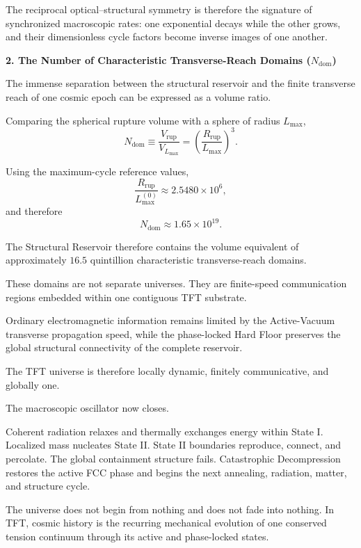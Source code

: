 The reciprocal optical--structural symmetry is therefore the signature of synchronized macroscopic rates: one exponential decays while the other grows, and their dimensionless cycle factors become inverse images of one another.


\vspace{0.5em}
\noindent\textbf{2. The Number of Characteristic Transverse-Reach Domains ($N_{\mathrm{dom}}$)}

The immense separation between the structural reservoir and the finite transverse reach of one cosmic epoch can be expressed as a volume ratio.

Comparing the spherical rupture volume with a sphere of radius $L_{\mathrm{max}}$,
\begin{equation}
    N_{\mathrm{dom}}
    \equiv
    \frac{
        V_{\mathrm{rup}}
    }{
        V_{L_{\mathrm{max}}}
    }
    =
    \left(
        \frac{
            R_{\mathrm{rup}}
        }{
            L_{\mathrm{max}}
        }
    \right)^3.
\end{equation}

Using the maximum-cycle reference values,
\begin{equation}
    \frac{
        R_{\mathrm{rup}}
    }{
        L_{\mathrm{max}}^{(0)}
    }
    \approx
    2.5480\times10^6,
\end{equation}
and therefore
\begin{equation}
    N_{\mathrm{dom}}
    \approx
    1.65\times10^{19}.
\end{equation}

The Structural Reservoir therefore contains the volume equivalent of approximately $16.5$ quintillion characteristic transverse-reach domains.

These domains are not separate universes. They are finite-speed communication regions embedded within one contiguous TFT substrate.

Ordinary electromagnetic information remains limited by the Active-Vacuum transverse propagation speed, while the phase-locked Hard Floor preserves the global structural connectivity of the complete reservoir.

The TFT universe is therefore locally dynamic, finitely communicative, and globally one.


\vspace{0.75em}

The macroscopic oscillator now closes.

Coherent radiation relaxes and thermally exchanges energy within State I. Localized mass nucleates State II. State II boundaries reproduce, connect, and percolate. The global containment structure fails. Catastrophic Decompression restores the active FCC phase and begins the next annealing, radiation, matter, and structure cycle.

The universe does not begin from nothing and does not fade into nothing. In TFT, cosmic history is the recurring mechanical evolution of one conserved tension continuum through its active and phase-locked states.
